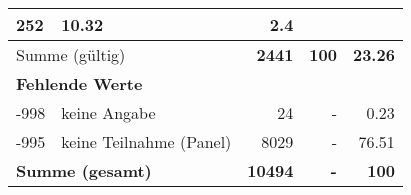 \begin{longtable}{lXrrr}
       \num{252} &
       \num[round-mode=places,round-precision=2]{10.32} &
         \num[round-mode=places,round-precision=2]{2.4} \\
     \midrule
     \multicolumn{2}{l}{Summe (gültig)} &
       \textbf{\num{2441}} &
     \textbf{\num{100}} &
       \textbf{\num[round-mode=places,round-precision=2]{23.26}} \\
     \multicolumn{5}{l}{\textbf{Fehlende Werte}}\\
       -998 &
       keine Angabe &
         \num{24} &
        - &
         \num[round-mode=places,round-precision=2]{0.23} \\
       -995 &
       keine Teilnahme (Panel) &
         \num{8029} &
        - &
         \num[round-mode=places,round-precision=2]{76.51} \\
     \midrule
     \multicolumn{2}{l}{\textbf{Summe (gesamt)}} &
          \textbf{\num{10494}} &
        \textbf{-} &
        \textbf{\num{100}} \\
     \bottomrule
     \end{longtable}
     
